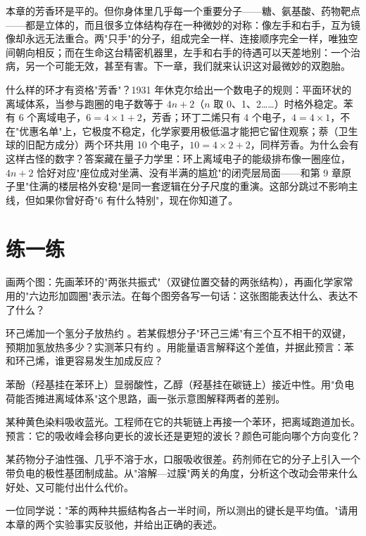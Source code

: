 本章的芳香环是平的。但你身体里几乎每一个重要分子——糖、氨基酸、药物靶点——都是立体的，而且很多立体结构存在一种微妙的对称：像左手和右手，互为镜像却永远无法重合。两"只手"的分子，组成完全一样、连接顺序完全一样，唯独空间朝向相反；而在生命这台精密机器里，左手和右手的待遇可以天差地别：一个治病，另一个可能无效，甚至有害。下一章，我们就来认识这对最微妙的双胞胎。

\begin{tiaozhan}
什么样的环才有资格"芳香"？1931 年休克尔给出一个数电子的规则：平面环状的离域体系，当参与跑圈的电子数等于 $4n+2$（$n$ 取 0、1、2……）时格外稳定。苯有 6 个离域电子，$6=4\times 1+2$，芳香；环丁二烯只有 4 个电子，$4=4\times 1$，不在"优惠名单"上，它极度不稳定，化学家要用极低温才能把它留住观察；萘（卫生球的旧配方成分）两个环共用 10 个电子，$10=4\times 2+2$，同样芳香。为什么会有这样古怪的数字？答案藏在量子力学里：环上离域电子的能级排布像一圈座位，$4n+2$ 恰好对应"座位成对坐满、没有半满的尴尬"的闭壳层局面——和第 9 章原子里"住满的楼层格外安稳"是同一套逻辑在分子尺度的重演。这部分跳过不影响主线，但如果你曾好奇"6 有什么特别"，现在你知道了。
\end{tiaozhan}

\section*{练一练}

\begin{sikaoti}
\item 画两个图：先画苯环的"两张共振式"（双键位置交替的两张结构），再画化学家常用的"六边形加圆圈"表示法。在每个图旁各写一句话：这张图能表达什么、表达不了什么？
\item 环己烯加一个氢分子放热约 。若某假想分子"环己三烯"有三个互不相干的双键，预期加氢放热多少？实测苯只有约 。用能量语言解释这个差值，并据此预言：苯和环己烯，谁更容易发生加成反应？
\item 苯酚（羟基挂在苯环上）显弱酸性，乙醇（羟基挂在碳链上）接近中性。用"负电荷能否摊进离域体系"这个思路，画一张示意图解释两者的差别。
\item 某种黄色染料吸收蓝光。工程师在它的共轭链上再接一个苯环，把离域跑道加长。预言：它的吸收峰会移向更长的波长还是更短的波长？颜色可能向哪个方向变化？
\item 某药物分子油性强、几乎不溶于水，口服吸收很差。药剂师在它的分子上引入一个带负电的极性基团制成盐。从"溶解—过膜"两关的角度，分析这个改动会带来什么好处、又可能付出什么代价。
\item 一位同学说："苯的两种共振结构各占一半时间，所以测出的键长是平均值。"请用本章的两个实验事实反驳他，并给出正确的表述。
\end{sikaoti}
